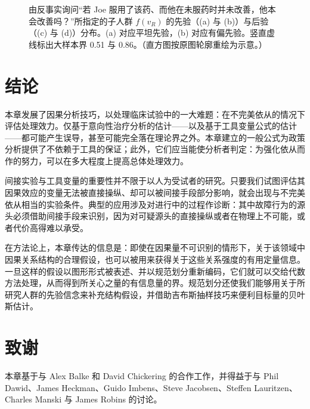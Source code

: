 \begin{figure}[htbp]
\centering
{}
\caption{由反事实询问“若 Joe 服用了该药、而他在未服药时并未改善，他本会改善吗？”所指定的子人群 $f(v_R)$ 的先验（(a) 与 (b)）与后验（(c) 与 (d)）分布。(a) 对应平坦先验，(b) 对应有偏先验。竖直虚线标出大样本界 0.51 与 0.86。（直方图按原图轮廓重绘为示意。）}
\label{fig:8.9}
\end{figure}

\section{结论}

本章发展了因果分析技巧，以处理临床试验中的一大难题：在不完美依从的情况下评估处理效力。仅基于意向性治疗分析的估计——以及基于工具变量公式的估计——都可能产生误导，甚至可能完全落在理论界之外。本章建立的一般公式为政策分析提供了不依赖于工具的保证；此外，它们应当能使分析者判定：为强化依从而作的努力，可以在多大程度上提高总体处理效力。

间接实验与工具变量的重要性并不限于以人为受试者的研究。只要我们试图评估其因果效应的变量无法被直接操纵、却可以被间接手段部分影响，就会出现与不完美依从相当的实验条件。典型的应用涉及对进行中的过程作诊断：其中故障行为的源头必须借助间接手段来识别，因为对可疑源头的直接操纵或者在物理上不可能，或者代价高得难以承受。

在方法论上，本章传达的信息是：即使在因果量不可识别的情形下，关于该领域中因果关系结构的合理假设，也可以被用来获得关于这些关系强度的有用定量信息。一旦这样的假设以图形形式被表述、并以规范划分重新编码，它们就可以交给代数方法处理，从而得到所关心之量的有信息量的界。规范划分还使我们能够用关于所研究人群的先验信念来补充结构假设，并借助吉布斯抽样技巧来便利目标量的贝叶斯估计。

\section*{致谢}

本章基于与 Alex Balke 和 David Chickering 的合作工作，并得益于与 Phil Dawid、James Heckman、Guido Imbens、Steve Jacobsen、Steffen Lauritzen、Charles Manski 与 James Robins 的讨论。
